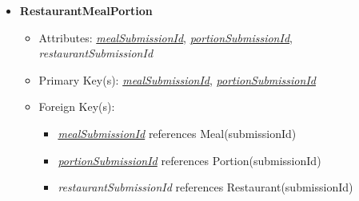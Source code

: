 \documentclass{article}
\begin{document}
\begin{itemize}
        \item \textbf{RestaurantMealPortion}
        \begin{itemize}
            \item Attributes: \underline{\textit{mealSubmissionId}}, \underline{\textit{portionSubmissionId}}, \textit{restaurantSubmissionId}
            \item Primary Key(s): \underline{\textit{mealSubmissionId}}, \underline{\textit{portionSubmissionId}}
            \item Foreign Key(s):
            \begin{itemize}
                \item \underline{\textit{mealSubmissionId}} references Meal(submissionId)
                \item \underline{\textit{portionSubmissionId}} references Portion(submissionId)
                \item \textit{restaurantSubmissionId} references Restaurant(submissionId)
            \end{itemize}            
        \end{itemize}

    \end{itemize}
    
\end{document}
